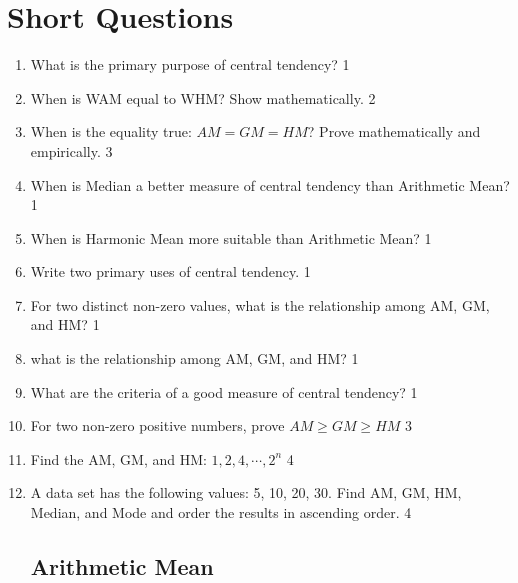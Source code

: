 \documentclass[a4paper,oneside]{book}
\begin{document}
\section{Short Questions}

\begin{enumerate}

\subsection{General Questions}

    \item What is the primary purpose of central tendency? \hfill 1
    \item When is WAM equal to WHM? Show mathematically. \hfill 2
    \item When is the equality true: $AM=GM=HM$? Prove mathematically and empirically.  \hfill 3
    \item When is Median a better measure of central tendency than Arithmetic Mean?  \hfill 1
    \item When is Harmonic Mean more suitable than Arithmetic Mean?  \hfill 1
    \item Write two primary uses of central tendency. \hfill 1
    \item For two distinct non-zero values, what is the relationship among AM, GM, and HM? \hfill 1
    \item what is the relationship among AM, GM, and HM? \hfill 1
    \item What are the criteria of a good measure of central tendency? \hfill 1
    \item For two non-zero positive numbers, prove $AM \ge GM \ge HM$ \hfill 3
    \item Find the AM, GM, and HM: $1,2,4,\cdots, 2^n$ \hfill 4
    \item A data set has the following values: 5, 10, 20, 30. Find AM, GM, HM, Median, and Mode and order the results in ascending order. \hfill 4

    
\subsection{Arithmetic Mean}


\end{enumerate}
\end{document}
